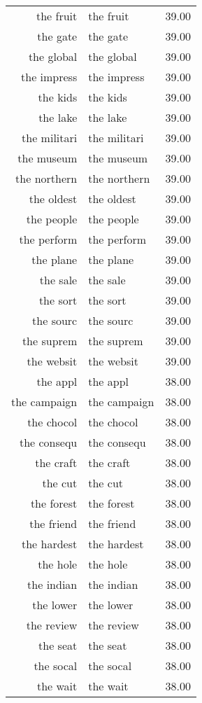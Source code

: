 \begin{table}[ht]
\begin{tabular}{rlr}
  the fruit & the fruit & 39.00 \\ 
  the gate & the gate & 39.00 \\ 
  the global & the global & 39.00 \\ 
  the impress & the impress & 39.00 \\ 
  the kids & the kids & 39.00 \\ 
  the lake & the lake & 39.00 \\ 
  the militari & the militari & 39.00 \\ 
  the museum & the museum & 39.00 \\ 
  the northern & the northern & 39.00 \\ 
  the oldest & the oldest & 39.00 \\ 
  the people & the people & 39.00 \\ 
  the perform & the perform & 39.00 \\ 
  the plane & the plane & 39.00 \\ 
  the sale & the sale & 39.00 \\ 
  the sort & the sort & 39.00 \\ 
  the sourc & the sourc & 39.00 \\ 
  the suprem & the suprem & 39.00 \\ 
  the websit & the websit & 39.00 \\ 
  the appl & the appl & 38.00 \\ 
  the campaign & the campaign & 38.00 \\ 
  the chocol & the chocol & 38.00 \\ 
  the consequ & the consequ & 38.00 \\ 
  the craft & the craft & 38.00 \\ 
  the cut & the cut & 38.00 \\ 
  the forest & the forest & 38.00 \\ 
  the friend & the friend & 38.00 \\ 
  the hardest & the hardest & 38.00 \\ 
  the hole & the hole & 38.00 \\ 
  the indian & the indian & 38.00 \\ 
  the lower & the lower & 38.00 \\ 
  the review & the review & 38.00 \\ 
  the seat & the seat & 38.00 \\ 
  the socal & the socal & 38.00 \\ 
  the wait & the wait & 38.00 \\ 

\end{tabular}
\end{table}
